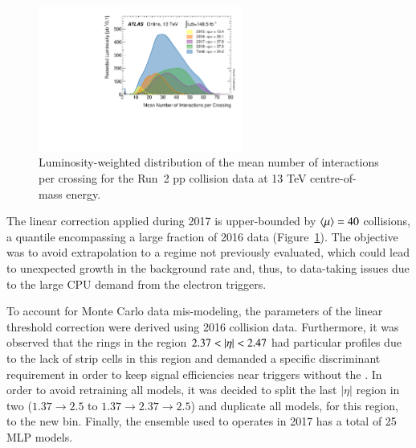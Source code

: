 



%
%



\begin{figure}[h!t]
\centering
\includegraphics[width=0.6\textwidth]{sections/ringer/figures/mu_2015_2018.pdf}
\caption{\label{fig:mu_2015_2018}
Luminosity-weighted distribution of the mean number of interactions per crossing
for the Run~2 pp collision data at 13 TeV centre-of-mass
energy.~\cite{atlas_lumi_run2_results}}
\end{figure}


The linear correction applied during 2017 is upper-bounded by $\langle \mu \rangle=40$
collisions, a quantile encompassing a large fraction of 2016 data
(Figure~\ref{fig:mu_2015_2018}). The objective was to avoid extrapolation to a
regime not previously evaluated, which could lead to unexpected growth in the
background rate and, thus, to data-taking issues due to the large CPU demand
from the electron triggers.

To account for Monte Carlo data mis-modeling, the parameters of the linear threshold
correction were derived using 2016 collision data. Furthermore, it was observed
that the rings in the region $2.37<\abseta<2.47$ had particular profiles due to
the lack of strip cells in this region and demanded a specific discriminant requirement in order to keep signal efficiencies near triggers without the \rnn{}. In order to avoid retraining all models, it was decided to split the last $|\eta|$ region in two ($1.37\rightarrow 2.5$ to $1.37\rightarrow2.37\rightarrow2.5$) and duplicate all models, for this region, to the new bin. Finally, the ensemble used to operates in 2017 has a total of 25 MLP models.




